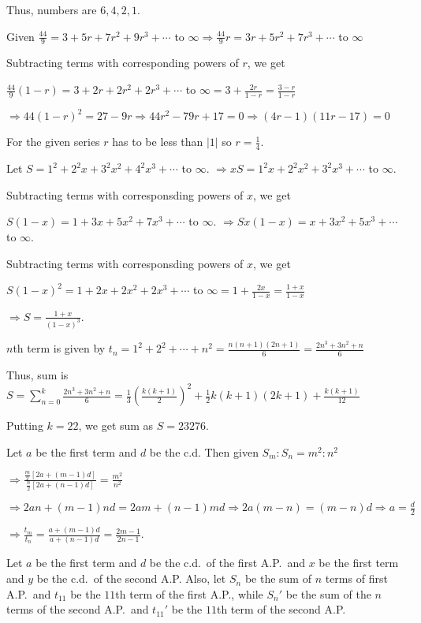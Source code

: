   Thus, numbers are $6, 4, 2, 1$.
\item Given $\frac{44}{9} = 3 + 5r + 7r^2 + 9r^3 + \cdots$ to $\infty \Rightarrow \frac{44}{9}r = 3r + 5r^2
  + 7r^3 + \cdots$ to $\infty$

  Subtracting terms with corresponding powers of $r$, we get

  $\frac{44}{9}(1 - r) = 3 + 2r + 2r^2 + 2r^3 + \cdots $ to $\infty = 3 + \frac{2r}{1 - r} = \frac{3 - r}{1
    - r}$

  $\Rightarrow 44(1 - r)^2 = 27 - 9r \Rightarrow 44r^2 - 79r + 17 = 0 \Rightarrow (4r - 1)(11r - 17) = 0$

  For the given series $r$ has to be less than $|1|$ so $r = \frac{1}{4}$.
\item Let $S = 1^2 + 2^2x + 3^2x^2 + 4^2x^3 + \cdots$ to $\infty$. $\Rightarrow xS = 1^2x + 2^2x^2 + 3^2x^3
  + \cdots$ to $\infty$.

  Subtracting terms with corresponsding powers of $x$, we get

  $S(1 - x) = 1 + 3x + 5x^2 + 7x^3 + \cdots$ to $\infty$. $\Rightarrow Sx(1 - x) = x + 3x^2 + 5x^3 + \cdots$
  to $\infty$.

  Subtracting terms with corresponsding powers of $x$, we get

  $S(1 - x)^2 = 1 + 2x + 2x^2 + 2x^3 + \cdots$ to $\infty = 1 + \frac{2x}{1 - x} = \frac{1 + x}{1 - x}$

  $\Rightarrow S = \frac{1 + x}{(1 - x)^3}$.
\item $n$th term is given by $t_n = 1^2 + 2^2 + \cdots + n^2 = \frac{n(n + 1)(2n + 1)}{6} = \frac{2n^3 +
  3n^2 + n}{6}$

  Thus, sum is $S = \displaystyle\sum_{n = 0}^k\frac{2n^3 + 3n^2 + n}{6} = \frac{1}{3}\left(\frac{k(k +
    1)}{2}\right)^2 + \frac{1}{2}k(k + 1)(2k + 1) + \frac{k(k + 1)}{12}$

  Putting $k = 22$, we get sum as $S = 23276$.
\item Let $a$ be the first term and $d$ be the c.d. Then given $S_m:S_n = m^2:n^2$

  $\Rightarrow \frac{\frac{m}{2}[2a + (m - 1)d]}{\frac{n}{2}[2a + (n - 1)d]} = \frac{m^2}{n^2}$

  $\Rightarrow 2an + (m - 1)nd = 2am + (n - 1)md \Rightarrow 2a(m - n) = (m - n)d \Rightarrow a
  = \frac{d}{2}$

  $\Rightarrow \frac{t_m}{t_n} = \frac{a + (m - 1)d}{a + (n - 1)d} = \frac{2m - 1}{2n - 1}$.
\item Let $a$ be the first term and $d$ be the c.d.\ of the first A.P.\ and $x$ be the first term and $y$ be
  the c.d.\ of the second A.P. Also, let $S_n$ be the sum of $n$ terms of first A.P.\ and $t_{11}$ be the
  $11$th term of the first A.P., while $S_n'$ be the sum of the $n$ terms of the second A.P.\ and $t_{11}'$
  be the $11$th term of the second A.P.

